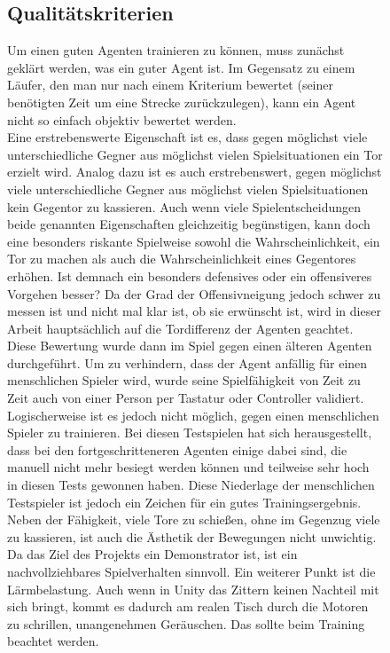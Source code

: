 \begin{figure}[h]
\subsection{Qualitätskriterien}
\label{subsect:kriterien}
 
Um einen guten Agenten trainieren zu können, muss zunächst geklärt werden, was ein guter Agent ist. Im Gegensatz zu einem Läufer, den man nur nach einem Kriterium bewertet (seiner benötigten Zeit um eine Strecke zurückzulegen), kann ein Agent nicht so einfach objektiv bewertet werden. \\
Eine erstrebenswerte Eigenschaft ist es, dass gegen möglichst viele unterschiedliche Gegner aus möglichst vielen Spielsituationen ein Tor erzielt wird. Analog dazu ist es auch erstrebenswert, gegen möglichst viele unterschiedliche Gegner aus möglichst vielen Spielsituationen kein Gegentor zu kassieren. Auch wenn viele Spielentscheidungen beide genannten Eigenschaften gleichzeitig begünstigen, kann doch eine besonders riskante Spielweise sowohl die Wahrscheinlichkeit, ein Tor zu machen als auch die Wahrscheinlichkeit eines Gegentores erhöhen. Ist demnach ein besonders defensives oder ein offensiveres Vorgehen besser? Da der Grad der Offensivneigung jedoch schwer zu messen ist und nicht mal klar ist, ob sie erwünscht ist, wird in dieser Arbeit hauptsächlich auf die Tordifferenz der Agenten geachtet. Diese Bewertung wurde dann im Spiel gegen einen älteren Agenten durchgeführt. Um zu verhindern, dass der Agent anfällig für einen menschlichen Spieler wird, wurde seine Spielfähigkeit von Zeit zu Zeit auch von einer Person per Tastatur oder Controller validiert. Logischerweise ist es jedoch nicht möglich, gegen einen menschlichen Spieler zu trainieren. Bei diesen Testspielen hat sich herausgestellt, dass bei den fortgeschritteneren Agenten einige dabei sind, die manuell nicht mehr besiegt werden können und teilweise sehr hoch in diesen Tests gewonnen haben. Diese Niederlage der menschlichen Testspieler ist jedoch ein Zeichen für ein gutes Trainingsergebnis.\\
Neben der Fähigkeit, viele Tore zu schießen, ohne im Gegenzug viele zu kassieren, ist auch die Ästhetik der Bewegungen nicht unwichtig. Da das Ziel des Projekts ein Demonstrator ist, ist ein nachvollziehbares Spielverhalten sinnvoll. Ein weiterer Punkt ist die Lärmbelastung. Auch wenn in Unity das Zittern keinen Nachteil mit sich bringt, kommt es dadurch am realen Tisch durch die Motoren zu schrillen, unangenehmen Geräuschen. Das sollte beim Training beachtet werden.
\end{figure}

